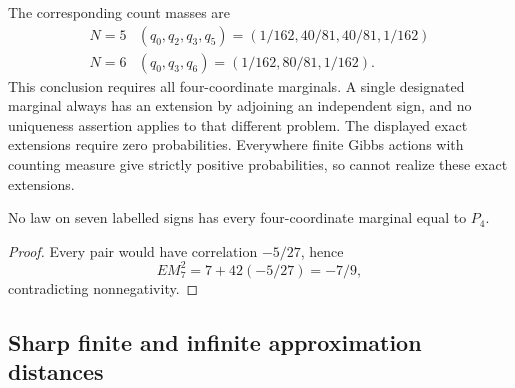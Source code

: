 The corresponding count masses are
\[
 \begin{array}{c|l}
 N=5&(q_0,q_2,q_3,q_5)=(1/162,40/81,40/81,1/162)\\
 N=6&(q_0,q_3,q_6)=(1/162,80/81,1/162).
 \end{array}
\]
This conclusion requires all four-coordinate marginals.
A single designated marginal always has an extension by
adjoining an independent sign, and no uniqueness assertion applies to
that different problem.
The displayed exact extensions require zero probabilities.
Everywhere finite Gibbs actions with counting measure give strictly
positive probabilities, so cannot realize these exact extensions.

\begin{corollary}\label{fin:no-seven}
No law on seven labelled signs has every four-coordinate marginal
equal to \(P_4\).
\end{corollary}
\begin{proof}
Every pair would have correlation \(-5/27\), hence
\[
 E M_7^2=7+42(-5/27)=-7/9,
\]
contradicting nonnegativity.
\end{proof}

\subsection{Sharp finite and infinite approximation distances}
\label{fin:distances}

